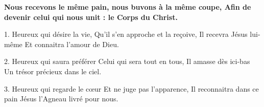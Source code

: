 \textbf{
Nous recevons le même pain, nous buvons à la même coupe,
Afin de devenir celui qui nous unit : le Corps du Christ.
}

1.
Heureux qui désire la vie,
Qu’il s’en approche et la reçoive,
Il recevra Jésus lui-même
Et connaitra l’amour de Dieu.

2.
Heureux qui saura préférer
Celui qui sera tout en tous,
Il amasse dès ici-bas
Un trésor précieux dans le ciel.

3.
Heureux qui regarde le cœur
Et ne juge pas l'apparence,
Il reconnaitra dans ce pain
Jésus l'Agneau livré pour nous.

%
%
%
%

